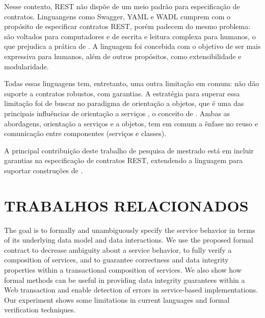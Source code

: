 Nesse contexto, REST não dispõe de um meio padrão para especificação de
contratos. Linguangens como Swagger, YAML e WADL cumprem com o propósito de
especificar contratos REST, porém padecem do mesmo problema: são voltados para
computadores e de escrita e leitura complexa para humanos, o que
prejudica a prática de \CtFirst{}. A linguagem \neoidl{} foi concebida com o objetivo de ser mais
expressiva para humanos, além de outros propósitos, como extensibilidade e
modularidade.

Todas essas linguagens tem, entretanto, uma outra limitação em comum: não dão
suporte a contratos robustos, com garantias. A estratégia para superar essa
limitação foi de buscar no paradigma de orientação a objetos, que é uma das
principais influências de orientação a serviços \cite{erl2009web},
o conceito de \designbycontract{}. Ambas as abordagens, orientação a serviços e
a objetos, tem em comum a ênfase no reuso e comunicação entre componentes
(serviços e classes).

A principal contribuição deste trabalho de
pesquisa de mestrado está em incluir garantias na especificação de
contratos REST, extendendo a linguagem \neoidl{} para suportar construções de
\designbycontract{}.


\section{TRABALHOS RELACIONADOS}
\vspace{-6mm}


The goal is to formally and unambiguously
specify the service behavior in terms of its underlying data model and data interactions.
 We use the proposed formal contract to
decrease ambiguity about a service behavior, to fully verify a composition of services, and to
guarantee correctness and data integrity properties within a transactional composition of services. 
We also show how formal methods can be useful in
providing data integrity guarantees within a Web transaction and enable detection of errors in
service-based implementations.
Our experiment shows some limitations in
current languages and formal verification techniques. 
\cite{moustafa2012formal}

\cite{naeem2010incremental}

\cite{rubio2013verifying}

\cite{ferrier2012design}

\cite{poyias2014design}



